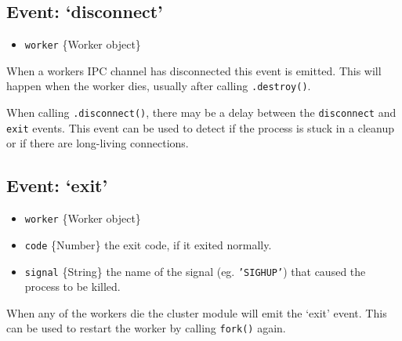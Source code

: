 \subsection{Event: `disconnect'}

\begin{itemize}
\item
  \texttt{worker} \{Worker object\}
\end{itemize}

When a workers IPC channel has disconnected this event is emitted. This
will happen when the worker dies, usually after calling
\texttt{.destroy()}.

When calling \texttt{.disconnect()}, there may be a delay between the
\texttt{disconnect} and \texttt{exit} events. This event can be used to
detect if the process is stuck in a cleanup or if there are long-living
connections.

\begin{Shaded}
\begin{Highlighting}[]
\NormalTok{(}\NormalTok{, }
  \NormalTok{(} \NormalTok{+ } \NormalTok{+ }\NormalTok{);}
\NormalTok{\});}
\end{Highlighting}
\end{Shaded}

\subsection{Event: `exit'}

\begin{itemize}
\item
  \texttt{worker} \{Worker object\}
\item
  \texttt{code} \{Number\} the exit code, if it exited normally.
\item
  \texttt{signal} \{String\} the name of the signal (eg.
  \texttt{'SIGHUP'}) that caused the process to be killed.
\end{itemize}

When any of the workers die the cluster module will emit the `exit'
event. This can be used to restart the worker by calling \texttt{fork()}
again.

\begin{Shaded}
\begin{Highlighting}[]
\NormalTok{(}\NormalTok{, }
   \NormalTok{;}
  \NormalTok{(} \NormalTok{+ } \NormalTok{+ }\NormalTok{);}
  \NormalTok{();}
\NormalTok{\});}
\end{Highlighting}
\end{Shaded}


